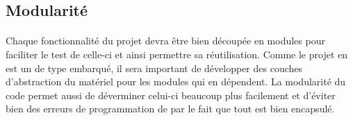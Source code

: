 	\subsection{Modularité}

		\paragraph{}
		Chaque fonctionnalité du projet devra être bien découpée en modules pour faciliter le test de celle-ci et ainsi permettre sa réutilisation. Comme le projet en est un de type embarqué, il sera important de développer des couches d’abstraction du matériel pour les modules qui en dépendent. La modularité du code permet aussi de déverminer celui-ci beaucoup plus facilement et d’éviter bien des erreurs de programmation de par le fait que tout est bien encapsulé.
